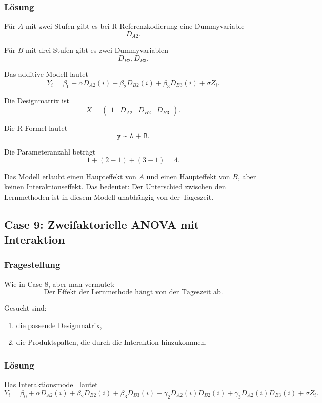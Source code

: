 \documentclass[10pt, letterpaper]{article}
\begin{document}
\subsubsection*{Lösung}

Für \(A\) mit zwei Stufen gibt es bei R-Referenzkodierung eine Dummyvariable
\[
D_{A2}.
\]

Für \(B\) mit drei Stufen gibt es zwei Dummyvariablen
\[
D_{B2},D_{B3}.
\]

Das additive Modell lautet
\[
Y_i
=
\beta_0+\alpha D_{A2}(i)
+\beta_2D_{B2}(i)+\beta_3D_{B3}(i)
+\sigma Z_i.
\]

Die Designmatrix ist
\[
X=
\begin{pmatrix}
1 & D_{A2} & D_{B2} & D_{B3}
\end{pmatrix}.
\]

Die R-Formel lautet
\[
\texttt{y \textasciitilde{} A + B}.
\]

Die Parameteranzahl beträgt
\[
1+(2-1)+(3-1)=4.
\]

Das Modell erlaubt einen Haupteffekt von \(A\) und einen Haupteffekt von \(B\), aber keinen Interaktionseffekt. Das bedeutet: Der Unterschied zwischen den Lernmethoden ist in diesem Modell unabhängig von der Tageszeit.

\subsection{Case 9: Zweifaktorielle ANOVA mit Interaktion}

\subsubsection*{Fragestellung}

Wie in Case 8, aber man vermutet:
\[
\text{Der Effekt der Lernmethode hängt von der Tageszeit ab.}
\]

Gesucht sind:
\begin{enumerate}
    \item die passende Designmatrix,
    \item die Produktspalten, die durch die Interaktion hinzukommen.
\end{enumerate}

\subsubsection*{Lösung}

Das Interaktionsmodell lautet
\[
Y_i
=
\beta_0+\alpha D_{A2}(i)
+\beta_2D_{B2}(i)+\beta_3D_{B3}(i)
+\gamma_2 D_{A2}(i)D_{B2}(i)
+\gamma_3 D_{A2}(i)D_{B3}(i)
+\sigma Z_i.
\]
\end{document}
